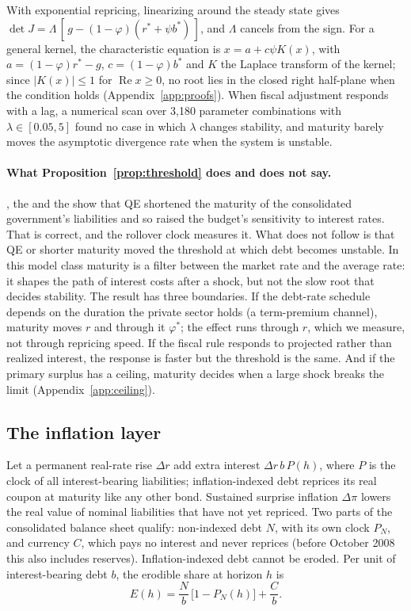 With exponential repricing, linearizing around the steady state gives $\det J=\Lambda\,[\,g-(1-\varphi)(r^*+\psi b^*)\,]$, and $\Lambda$ cancels from the sign. For a general kernel, the characteristic equation is $x=a+c\psi K(x)$, with $a=(1-\varphi)r^*-g$, $c=(1-\varphi)b^*$ and $K$ the Laplace transform of the kernel; since $|K(x)|\le1$ for $\operatorname{Re}x\ge0$, no root lies in the closed right half-plane when the condition holds (Appendix~\ref{app:proofs}). When fiscal adjustment responds with a lag, a numerical scan over 3,180 parameter combinations with $\lambda\in[0.05,5]$ found no case in which $\lambda$ changes stability, and maturity barely moves the asymptotic divergence rate when the system is unstable.

\paragraph{What Proposition~\ref{prop:threshold} does and does not say.} \citet{cbo2022}, the \citet{obr2021} and the \citet{tbac2020,tbac2026} show that QE shortened the maturity of the consolidated government's liabilities and so raised the budget's sensitivity to interest rates. That is correct, and the rollover clock measures it. What does not follow is that QE or shorter maturity moved the threshold at which debt becomes unstable. In this model class maturity is a filter between the market rate and the average rate: it shapes the path of interest costs after a shock, but not the slow root that decides stability. The result has three boundaries. If the debt-rate schedule depends on the duration the private sector holds (a term-premium channel), maturity moves $r$ and through it $\varphi^*$; the effect runs through $r$, which we measure, not through repricing speed. If the fiscal rule responds to projected rather than realized interest, the response is faster but the threshold is the same. And if the primary surplus has a ceiling, maturity decides when a large shock breaks the limit (Appendix~\ref{app:ceiling}).

\subsection{The inflation layer}\label{sec:inflationlayer}

Let a permanent real-rate rise $\Delta r$ add extra interest $\Delta r\,b\,P(h)$, where $P$ is the clock of all interest-bearing liabilities; inflation-indexed debt reprices its real coupon at maturity like any other bond. Sustained surprise inflation $\Delta\pi$ lowers the real value of nominal liabilities that have not yet repriced. Two parts of the consolidated balance sheet qualify: non-indexed debt $N$, with its own clock $P_N$, and currency $C$, which pays no interest and never reprices (before October 2008 this also includes reserves). Inflation-indexed debt cannot be eroded. Per unit of interest-bearing debt $b$, the erodible share at horizon $h$ is
\begin{equation}
E(h)=\frac{N}{b}\,\big[1-P_N(h)\big]+\frac{C}{b}.
\end{equation}

